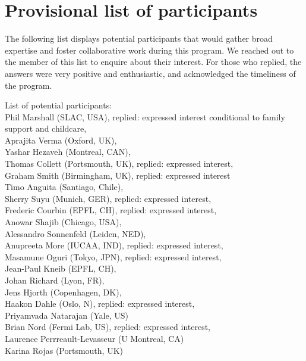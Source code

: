 \documentclass[11pt, letterpaper]{article}
\begin{document}
\section{Provisional list of participants}

The following list displays potential participants that would gather broad expertise and foster collaborative work during this program. We reached out to the member of this list to enquire about their interest. For those who replied, the answers were very positive and enthusiastic, and acknowledged the timeliness of the program.

List of potential participants: \\
Phil Marshall (SLAC, USA), replied: expressed interest conditional to family support and childcare, \\%
Aprajita Verma (Oxford, UK), \\%
Yashar Hezaveh (Montreal, CAN), \\%
Thomas Collett (Portsmouth, UK), replied: expressed interest,\\%
Graham Smith (Birmingham, UK), replied: expressed interest \\%
Timo Anguita (Santiago, Chile), \\%
Sherry Suyu (Munich, GER), replied: expressed interest,\\%
Frederic Courbin (EPFL, CH), replied: expressed interest, \\%
Anowar Shajib (Chicago, USA), \\%
Alessandro Sonnenfeld (Leiden, NED), \\%
Anupreeta More (IUCAA, IND), replied: expressed interest, \\%
Masamune Oguri (Tokyo, JPN), replied: expressed interest,\\
Jean-Paul Kneib (EPFL, CH),\\
Johan Richard (Lyon, FR), \\
Jens Hjorth (Copenhagen, DK), \\
Haakon Dahle (Oslo, N), replied: expressed interest,\\
Priyamvada Natarajan (Yale, US) \\
Brian Nord (Fermi Lab, US), replied: expressed interest, \\%
Laurence Perrreault-Levasseur (U Montreal, CA) \\%
Karina Rojas (Portsmouth, UK) \\%



\end{document}
